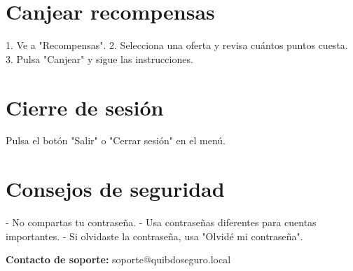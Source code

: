 \documentclass[12pt]{article}
\begin{document}
\section*{Canjear recompensas}
1. Ve a "Recompensas".
2. Selecciona una oferta y revisa cuántos puntos cuesta.
3. Pulsa "Canjear" y sigue las instrucciones.

\section*{Cierre de sesión}
Pulsa el botón "Salir" o "Cerrar sesión" en el menú.

\section*{Consejos de seguridad}
- No compartas tu contraseña.
- Usa contraseñas diferentes para cuentas importantes.
- Si olvidaste la contraseña, usa "Olvidé mi contraseña".

\vspace{1cm}
\noindent\textbf{Contacto de soporte:} soporte@quibdoseguro.local  
\end{document}
